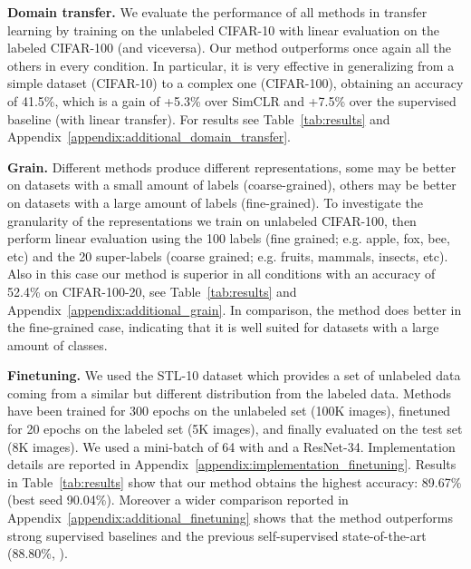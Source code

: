 \documentclass{article}
\begin{document}
\textbf{Domain transfer.}  We evaluate the performance of all methods in transfer learning by training on the unlabeled CIFAR-10 with linear evaluation on the labeled CIFAR-100 (and viceversa). Our method outperforms once again all the others in every condition. In particular, it is very effective in generalizing from a simple dataset (CIFAR-10) to a complex one (CIFAR-100), obtaining an accuracy of 41.5\%, which is a gain of +5.3\% over SimCLR and +7.5\% over the supervised baseline (with linear transfer). For results see Table~\ref{tab:results} and Appendix~\ref{appendix:additional_domain_transfer}.

\textbf{Grain.} Different methods produce different representations, some may be better on datasets with a small amount of labels (coarse-grained), others may be better on datasets with a large amount of labels (fine-grained). To investigate the granularity of the representations we train on unlabeled CIFAR-100, then perform linear evaluation using the 100 labels (fine grained; e.g. apple, fox, bee, etc) and the 20 super-labels (coarse grained; e.g. fruits, mammals, insects, etc). Also in this case our method is superior in all conditions with an accuracy of 52.4\% on CIFAR-100-20, see Table~\ref{tab:results} and Appendix~\ref{appendix:additional_grain}. In comparison, the method does better in the fine-grained case, indicating that it is well suited for datasets with a large amount of classes.

\textbf{Finetuning.} We used the STL-10 dataset \citep{coates2011analysis} which provides a set of unlabeled data coming from a similar but different distribution from the labeled data. Methods have been trained for 300 epochs on the unlabeled set (100K images), finetuned for 20 epochs on the labeled set (5K images), and finally evaluated on the test set (8K images). We used a mini-batch of 64 with  and a ResNet-34. Implementation details are reported in Appendix~\ref{appendix:implementation_finetuning}. Results in Table~\ref{tab:results} show that our method obtains the highest accuracy: 89.67\% (best seed 90.04\%). Moreover a wider comparison reported in Appendix~\ref{appendix:additional_finetuning} shows that the method outperforms strong supervised baselines and the previous self-supervised state-of-the-art (88.80\%, \citealp{ji2019invariant}).
\end{document}
